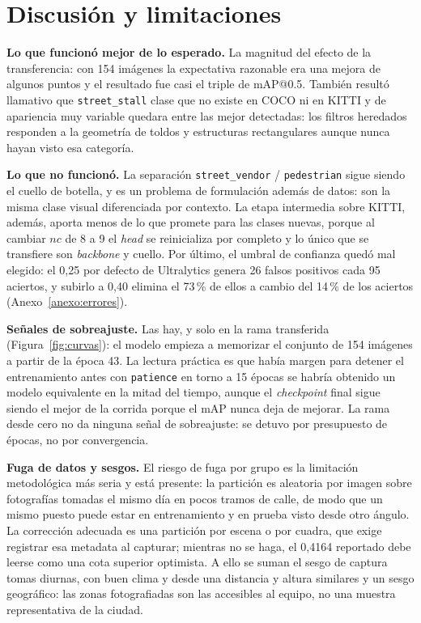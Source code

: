 \documentclass[10pt,a4paper]{article}
\begin{document}
\section{Discusión y limitaciones}
\textbf{Lo que funcionó mejor de lo esperado.} La magnitud del efecto de la
transferencia: con 154 imágenes la expectativa razonable era una mejora de algunos puntos
y el resultado fue casi el triple de mAP@0.5. También resultó llamativo que
\texttt{street\_stall} clase que no existe en COCO ni en KITTI y de apariencia muy
variable quedara entre las mejor detectadas: los filtros heredados responden a la
geometría de toldos y estructuras rectangulares aunque nunca hayan visto esa categoría.

\textbf{Lo que no funcionó.} La separación \texttt{street\_vendor} /
\texttt{pedestrian} sigue siendo el cuello de botella, y es un problema de formulación
además de datos: son la misma clase visual diferenciada por contexto. La etapa intermedia
sobre KITTI, además, aporta menos de lo que promete para las clases nuevas, porque al
cambiar $nc$ de 8 a 9 el \emph{head} se reinicializa por completo y lo único que se
transfiere son \emph{backbone} y cuello. Por último, el umbral de confianza quedó mal
elegido: el 0{,}25 por defecto de Ultralytics genera 26 falsos positivos cada 95 aciertos,
y subirlo a 0{,}40 elimina el 73\,\% de ellos a cambio del 14\,\% de los aciertos
(Anexo~\ref{anexo:errores}).

\textbf{Señales de sobreajuste.} Las hay, y solo en la rama transferida
(Figura~\ref{fig:curvas}): el modelo empieza a memorizar el conjunto de 154 imágenes a
partir de la época 43. La lectura práctica es que había margen para detener el
entrenamiento antes con \texttt{patience} en torno a 15 épocas se habría obtenido un
modelo equivalente en la mitad del tiempo, aunque el \emph{checkpoint} final sigue
siendo el mejor de la corrida porque el mAP nunca deja de mejorar. La rama desde cero no
da ninguna señal de sobreajuste: se detuvo por presupuesto de épocas, no por
convergencia.

\textbf{Fuga de datos y sesgos.} El riesgo de fuga por grupo es la limitación
metodológica más seria y está presente: la partición es aleatoria por imagen sobre
fotografías tomadas el mismo día en pocos tramos de calle, de modo que un mismo puesto
puede estar en entrenamiento y en prueba visto desde otro ángulo. La corrección adecuada
es una partición por escena o por cuadra, que exige registrar esa metadata al capturar;
mientras no se haga, el 0{,}4164 reportado debe leerse como una cota superior optimista.
A ello se suman el sesgo de captura tomas diurnas, con buen clima y desde una
distancia y altura similares y un sesgo geográfico: las zonas fotografiadas son las
accesibles al equipo, no una muestra representativa de la ciudad.
\end{document}
